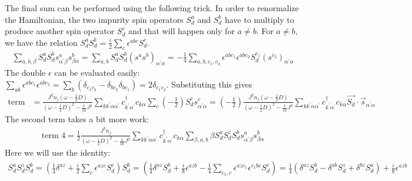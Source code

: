 \documentclass{revtex4-2}
\numberwithin{equation}{section}
\begin{document}
The final sum can be performed using the following trick. In order to renormalize the Hamiltonian, the two impurity spin operators \(S_d^a\) and \(S_d^b\) have to multiply to produce another spin operator \(S_d^c\) and that will happen only for \(a\neq b\). For \(a \neq b\), we have the relation \(S_d^a S_d^b = \frac{i}{2}\sum_c \epsilon^{abc}S_d^c\).
\begin{equation}\begin{aligned}
	\sum_{a,b,\beta}S_d^a S_d^b s^a_{\alpha^\prime \beta}s^b_{\beta \alpha} = \sum_{a,b}S_d^a S_d^b \left(s^a s^b\right)_{\alpha^\prime \alpha} = -\frac{1}{4}\sum_{a,b,c_1,c_2}\epsilon^{abc_1}\epsilon^{abc_2}S_d^{c_1}\left(s^{c_2}\right)_{\alpha^\prime \alpha} 
\end{aligned}\end{equation}
The double \(\epsilon\) can be evaluated easily: \(\sum_{ab}\epsilon^{abc_1}\epsilon^{abc_2} = \sum_b\left(\delta_{c_1 c_2} - \delta_{b c_2}\delta_{b c_1}\right) = 2 \delta_{c_1 c_2}\). Substituting this gives
\begin{equation}\begin{aligned}
	\label{term1}
	\text{term 3} &= \frac{J^2 n_j \left(\omega - \frac{1}{2}D\right)}{\left(\omega - \frac{1}{2}D\right)^2 - \frac{1}{16}J^2}\sum_{k k^\prime \alpha \alpha^\prime} c^\dagger_{k^\prime\alpha^\prime} c_{k\alpha} \sum_{c} \left(-\frac{1}{2}\right)S_d^c s^c_{\alpha^\prime \alpha} = \left(-\frac{1}{2}\right)\frac{J^2 n_j \left(\omega - \frac{1}{2}D\right)}{\left(\omega - \frac{1}{2}D\right)^2 - \frac{1}{16}J^2}\sum_{k k^\prime \alpha \alpha^\prime} c^\dagger_{k^\prime\alpha^\prime} c_{k\alpha}  \vec{S_d}\cdot\vec{s}_{\alpha^\prime \alpha}
\end{aligned}\end{equation}
The second term takes a bit more work:
\begin{equation}\begin{aligned}
	\text{term 4} = \frac{1}{2}\frac{J^3 n_j }{\left(\omega - \frac{1}{2}D\right)^2 - \frac{1}{16}J^2}\sum_{k k^\prime \alpha \alpha^\prime} c^\dagger_{k^\prime\alpha^\prime} c_{k\alpha} \sum_{\beta,a,b}\beta S_d^a S_d^z  S_d^bs^a_{\alpha^\prime \beta}s^b_{\beta \alpha}
\end{aligned}\end{equation}
Here we will use the identity:
\begin{equation}\begin{aligned}
	\label{identity_SSS}
	S_d^a S_d^z S_d^b = \left(\frac{1}{4}\delta^{az} + \frac{i}{2}\sum_c \epsilon^{azc}S_d^c\right)S_d^b = \left(\frac{1}{4}\delta^{az}S_d^b + \frac{i}{8} \epsilon^{azb}  - \frac{1}{4}\sum_{c_1,c} \epsilon^{azc_1} \epsilon^{c_1 b c} S_d^c\right) = \frac{1}{4}\left(\delta^{az}S_d^b - \delta^{ab}S_d^z + \delta^{bz}S_d^a\right) + \frac{i}{8}\epsilon^{azb}
\end{aligned}\end{equation}
\end{document}
